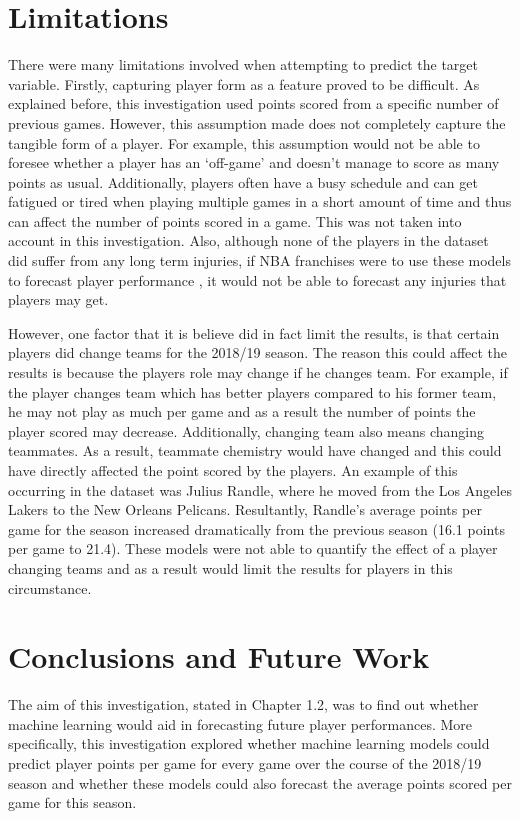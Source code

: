 \documentclass[a4paper,11pt,twoside]{article}
\begin{document}
\newpage

\section{Limitations}
There were many limitations involved when attempting to predict the target variable. Firstly, capturing player form as a feature proved to be difficult. As explained before, this investigation used points scored from a specific number of previous games. However, this assumption made does not completely capture the tangible form of a player. For example, this assumption would not be able to foresee whether a player has an `off-game' and doesn't manage to score as many points as usual. Additionally, players often have a busy schedule and can get fatigued or tired when playing multiple games in a short amount of time and thus can affect the number of points scored in a game. This was not taken into account in this investigation. Also, although none of the players in the dataset did suffer from any long term injuries, if NBA franchises were to use these models to forecast player performance , it would not be able to forecast any injuries that players may get. 

However, one factor that it is believe did in fact limit the results, is that certain players did change teams for the 2018/19 season. The reason this could affect the results is because the players role may change if he changes team. For example, if the player changes team which has better players compared to his former team, he may not play as much per game and as a result the number of points the player scored may decrease. Additionally, changing team also means changing teammates. As a result, teammate chemistry would have changed and this could have directly affected the point scored by the players. An example of this occurring in the dataset was Julius Randle, where he moved from the Los Angeles Lakers to the New Orleans Pelicans. Resultantly, Randle's average points per game for the season increased dramatically from the previous season (16.1 points per game to 21.4). These models were not able to quantify the effect of a player changing teams and as a result would limit the results for players in this circumstance.


\newpage
\section{Conclusions and Future Work}
The aim of this investigation, stated in Chapter 1.2, was to find out whether machine learning would aid in forecasting future player performances. More specifically, this investigation explored whether machine learning models could predict player points per game for every game over the course of the 2018/19 season and whether these models could also forecast the average points scored per game for this season. 
\end{document}
